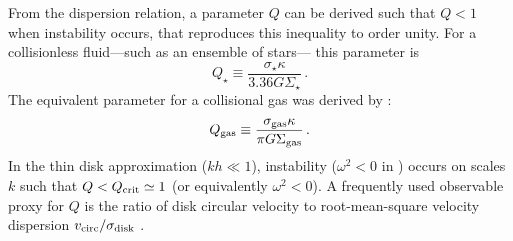 \IfFileExists{emulateapjlegacy.cls}{\documentclass[iop]{emulateapjlegacy}}{\documentclass[iop]{emulateapj}}
\newcommand{\AF}[1]{({\bf \color{afcolor} AF: #1})}
\newcommand{\MM}[1]{({\bf \color{mmcolor} MM: #1})}
\begin{document}
From the dispersion relation, a parameter $Q$ can be derived such that $Q < 1$ when instability occurs, that reproduces this inequality to order unity.
For a collisionless fluid---such as an ensemble of stars--- this parameter is \citep{Toomre64a}
\begin{equation}
Q_{\star} \equiv\frac{\sigma_{\star}\kappa}{3.36 G \Sigma_{\star}}\,.
\end{equation}
The equivalent parameter for a collisional gas was derived by
    \citep{Goldreich65a}:
\begin{equation}
Q_{\rm gas}\equiv\frac{\sigma_{\rm gas}\kappa}{\pi G \Sigma_{\rm gas}}\,.
\label{eqn:Q}
\end{equation}
In the thin disk approximation ($kh\ll1$), instability ($\omega^2 < 0$ in  ) occurs on scales $k$ such that $Q < Q_{\rm crit}\simeq1$ (or equivalently $\omega^2 < 0$). 
     A frequently used observable proxy for $Q$ is the ratio of disk circular velocity to root-mean-square velocity dispersion
$v_{\rm circ}/\sigma_{\rm disk}$
\citep[e.g.,][]{GarciaBurillo03a, Genzel11a, Kassin12a, Leung19a}.
%
\end{document}
